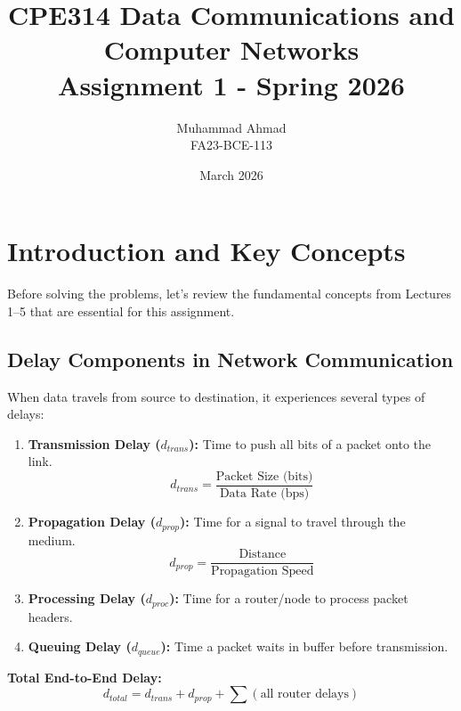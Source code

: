 \documentclass[12pt,a4paper]{article}
\title{\textbf{CPE314 Data Communications and Computer Networks}\\
\Large Assignment 1 - Spring 2026}
\author{Muhammad Ahmad\\FA23-BCE-113}
\date{March 2026}
\begin{document}
\maketitle

\tableofcontents
\newpage

\section{Introduction and Key Concepts}

Before solving the problems, let's review the fundamental concepts from Lectures 1--5 that are essential for this assignment.

\subsection{Delay Components in Network Communication}

\begin{contextbox}
When data travels from source to destination, it experiences several types of delays:

\begin{enumerate}
    \item \textbf{Transmission Delay ($d_{trans}$):} Time to push all bits of a packet onto the link.
    \[d_{trans} = \frac{\text{Packet Size (bits)}}{\text{Data Rate (bps)}}\]
    
    \item \textbf{Propagation Delay ($d_{prop}$):} Time for a signal to travel through the medium.
    \[d_{prop} = \frac{\text{Distance}}{\text{Propagation Speed}}\]
    
    \item \textbf{Processing Delay ($d_{proc}$):} Time for a router/node to process packet headers.
    
    \item \textbf{Queuing Delay ($d_{queue}$):} Time a packet waits in buffer before transmission.
\end{enumerate}

\textbf{Total End-to-End Delay:}
\[d_{total} = d_{trans} + d_{prop} + \sum(\text{all router delays})\]
\end{contextbox}
\end{document}
